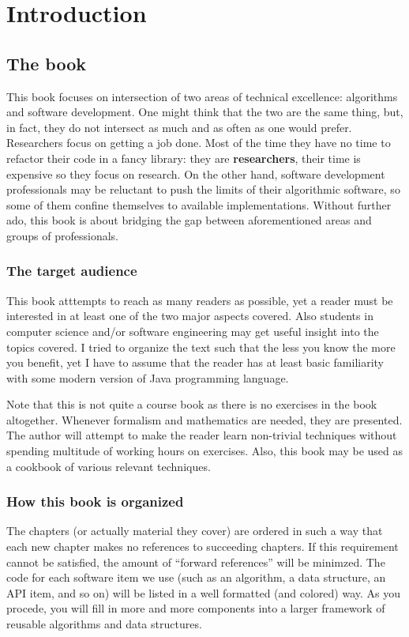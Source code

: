 \chapter{Introduction}

\section{The book}
This book focuses on intersection of two areas of technical excellence: algorithms and software development. One might think that the two are the same thing,
but, in fact, they do not intersect as much and as often as one would prefer. Researchers focus on getting a job done. Most of the time they have no time to
refactor their code in a fancy library: they are \textbf{researchers}, their time is expensive so they focus on research. On the other hand, software development
professionals may be reluctant to push the limits of their algorithmic software, so some of them confine themselves to available implementations. Without
further ado, this book is about bridging the gap between aforementioned areas and groups of professionals.

\subsection{The target audience}
This book atttempts to reach as many readers as possible, yet a reader must be interested in at least one of the two major aspects covered. Also students in
computer science and/or software engineering may get useful insight into the topics covered. I tried to organize the text such that the less you know the more
you benefit, yet I have to assume that the reader has at least basic familiarity with some modern version of Java programming language.

Note that this is not quite a course book as there is no exercises in the book altogether. Whenever formalism and mathematics are needed, they are presented.
The author will attempt to make the reader learn non-trivial techniques without spending multitude of working hours on exercises. Also, this book may be used
as a cookbook of various relevant techniques.

\subsection{How this book is organized}
The  chapters (or actually material they cover) are ordered in such a way that each new chapter makes no references to succeeding chapters. If this requirement
cannot be satisfied, the amount of ``forward references'' will be minimzed. The code for each software item we use (such as an algorithm, a data structure, an
API item, and so on) will be listed in a well formatted (and colored) way. As you procede, you will fill in more and more components into a larger framework of
reusable algorithms and data structures.

